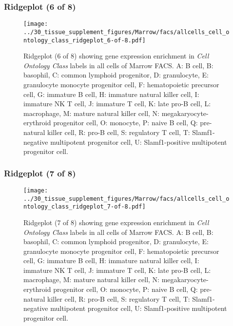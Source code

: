 \subsubsection{Ridgeplot (6 of 8)}
\begin{figure}[h]
\centering
\texttt{[image: ../30\_tissue\_supplement\_figures/Marrow/facs/allcells\_cell\_ontology\_class\_ridgeplot\_6-of-8.pdf]}

\caption{ Ridgeplot (6 of 8)  showing gene expression enrichment in \emph{Cell Ontology Class} labels in all cells of Marrow FACS. A: B cell, B: basophil, C: common lymphoid progenitor, D: granulocyte, E: granulocyte monocyte progenitor cell, F: hematopoietic precursor cell, G: immature B cell, H: immature natural killer cell, I: immature NK T cell, J: immature T cell, K: late pro-B cell, L: macrophage, M: mature natural killer cell, N: megakaryocyte-erythroid progenitor cell, O: monocyte, P: naive B cell, Q: pre-natural killer cell, R: pro-B cell, S: regulatory T cell, T: Slamf1-negative multipotent progenitor cell, U: Slamf1-positive multipotent progenitor cell.}
\end{figure}


\clearpage

\subsubsection{Ridgeplot (7 of 8)}
\begin{figure}[h]
\centering
\texttt{[image: ../30\_tissue\_supplement\_figures/Marrow/facs/allcells\_cell\_ontology\_class\_ridgeplot\_7-of-8.pdf]}

\caption{ Ridgeplot (7 of 8)  showing gene expression enrichment in \emph{Cell Ontology Class} labels in all cells of Marrow FACS. A: B cell, B: basophil, C: common lymphoid progenitor, D: granulocyte, E: granulocyte monocyte progenitor cell, F: hematopoietic precursor cell, G: immature B cell, H: immature natural killer cell, I: immature NK T cell, J: immature T cell, K: late pro-B cell, L: macrophage, M: mature natural killer cell, N: megakaryocyte-erythroid progenitor cell, O: monocyte, P: naive B cell, Q: pre-natural killer cell, R: pro-B cell, S: regulatory T cell, T: Slamf1-negative multipotent progenitor cell, U: Slamf1-positive multipotent progenitor cell.}
\end{figure}


\clearpage

